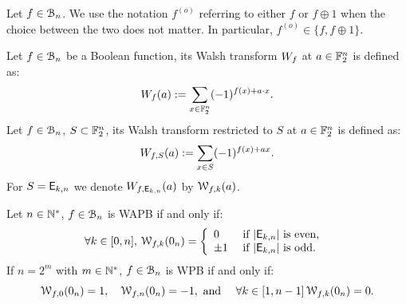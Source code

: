 \documentclass[11pt]{llncs}
\begin{document}
\begin{remark}
    Let $f\in \mathcal{B}_{n}$. We use the notation $f^{(o)}$ referring to either $f$ or $f\oplus1$ when the choice between the two does not matter. In particular, $f^{(o)} \in \{f, f\oplus 1\}$.
\end{remark}



\begin{definition}\label{def:walsh_transform}
	Let $f\in \mathcal{B}_{n}$ be a Boolean function, its Walsh transform $W_{f}$ at $a \in \mathbb{F}_2^n$ is defined as:
	\[  W_{f} (a) := \sum_{x \in \mathbb{F}_2^n} (-1)^{f(x) +  a \cdot x }.\]
	Let $f\in \mathcal{B}_{n}$, $S \subset \mathbb{F}_2^n$, its Walsh transform restricted to $S$ at $a \in \mathbb{F}_2^n$ is defined as:
	\[  W_{f,S} (a) := \sum_{x\in S} (-1)^{f(x)+ax}.\]
	For $S=\mathsf{E}_{k,n}$ we denote $W_{f,\mathsf{E}_{k,n}} (a)$ by $\mathcal{W}_{f,k}(a)$.%
	
\end{definition}

\begin{Prop}\label{prop:WAPBWalsh}
	
Let $n\in \mathbb{N}^*$, $f\in \mathcal{B}_{n}$ is WAPB if and only if:
\[\forall k \in [0,n], \, \mathcal{W}_{f,k}(0_n)=   
\left \{
\begin{array}{l l}
0  & \text{ if } |\mathsf{E}_{k,n}| \text{ is even, } \\
\pm 1 & \text{ if }  |\mathsf{E}_{k,n}| \text{ is odd.}
\end{array}\right. \] 
If $n=2^m$ with $m\in \mathbb{N}^*$, $f\in \mathcal{B}_{n}$ is WPB if and only if:
\[\mathcal{W}_{f,0}(0_n)=1, \quad \mathcal{W}_{f,n}(0_n)=-1, \text{ and } \quad \forall k \in [1,n-1] \,  \mathcal{W}_{f,k}(0_n)=0. \] 
	
\end{Prop}
\end{document}
